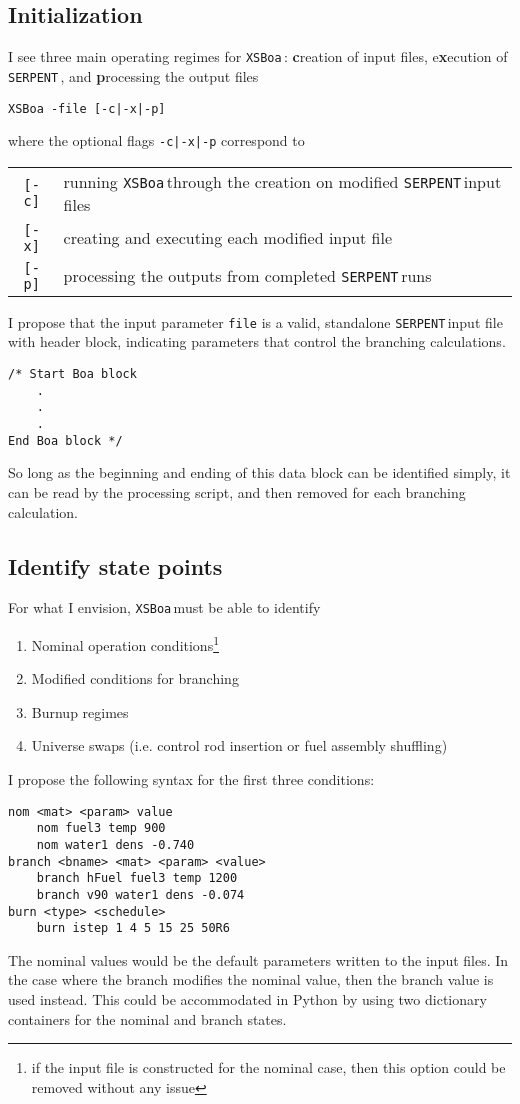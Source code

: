 \documentclass{article}
\newcommand{\boa}{\texttt{XSBoa}\,}
\newcommand{\serp}{\texttt{SERPENT}\,}
\begin{document}
	\subsection{Initialization} \label{sec:init}
	I see three main operating regimes for \boa: \textbf{c}reation of input files, e\textbf{x}ecution of \serp, and \textbf{p}rocessing the output files
\begin{lstlisting}
XSBoa -file [-c|-x|-p]
\end{lstlisting}
	where the optional flags \texttt{-c|-x|-p} correspond to
\begin{table}[h!]
	\begin{tabular}{cl}
		\texttt{[-c]} & running \boa through the creation on modified \serp input files \\
		\texttt{[-x]} & creating and executing each modified input file \\
		\texttt{[-p]} & processing the outputs from completed \serp runs
	\end{tabular}
\end{table}
	I propose that the input parameter \texttt{file} is a valid, standalone \serp input file with header block, indicating parameters that control the branching calculations.
\begin{lstlisting}
/* Start Boa block
	.
	.
	.
End Boa block */
\end{lstlisting}
	So long as the beginning and ending of this data block can be identified simply, it can be read by the processing script, and then removed for each branching calculation.
	\subsection{Identify state points}
	For what I envision, \boa must be able to identify 
	\begin{enumerate}
		\item Nominal operation conditions\footnote{if the input file is constructed for the nominal case, then this option could be removed without any issue}
		\item Modified conditions for branching
		\item Burnup regimes
		\item Universe swaps (i.e. control rod insertion or fuel assembly shuffling)
	\end{enumerate}
	I propose the following syntax for the first three conditions:
\begin{lstlisting}
nom <mat> <param> value
	nom fuel3 temp 900
	nom water1 dens -0.740
branch <bname> <mat> <param> <value>
	branch hFuel fuel3 temp 1200
	branch v90 water1 dens -0.074
burn <type> <schedule>
	burn istep 1 4 5 15 25 50R6
\end{lstlisting}
	The nominal values would be the default parameters written to the input files.
	In the case where the branch modifies the nominal value, then the branch value is used instead.
	This could be accommodated in Python by using two dictionary containers for the nominal and branch states. 
	
\end{document}
